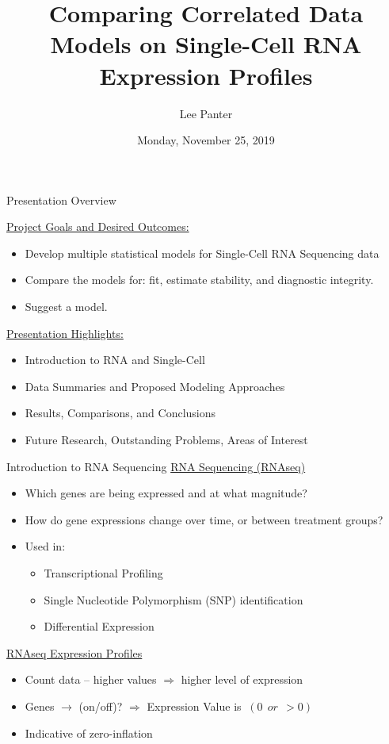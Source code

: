 \documentclass[11pt]{beamer}
\author{Lee Panter}
\title{Comparing Correlated Data Models on Single-Cell RNA Expression Profiles}
\date{Monday, November 25, 2019}
\begin{document}
\begin{frame}
\titlepage
\end{frame}


\begin{frame}{Presentation Overview}

\underline{Project Goals and Desired Outcomes:}
\begin{itemize}
	\item Develop multiple statistical models for Single-Cell RNA Sequencing data
	\item Compare the models for: fit, estimate stability, and diagnostic integrity.
	\item Suggest a model.  
\end{itemize}

\vspace{5pt}

\underline{Presentation Highlights:}
\begin{itemize}
	\item Introduction to RNA and Single-Cell
	\item Data Summaries and Proposed Modeling Approaches
	\item Results, Comparisons, and Conclusions
	\item Future Research, Outstanding Problems, Areas of Interest
\end{itemize}
\end{frame}

\begin{frame}{Introduction to RNA Sequencing}
	\underline{RNA Sequencing (RNAseq)}		
		\begin{itemize}
			\item Which genes are being expressed and at what magnitude?
			\item How do gene expressions change over time, or between treatment groups? \cite{maher2009transcriptome}	
			\item Used in: 
			\begin{itemize}
				\item Transcriptional Profiling
				\item Single Nucleotide Polymorphism (SNP) identification
				\item Differential Expression
			\end{itemize}
		\end{itemize}
	\underline{RNAseq Expression Profiles}
	\begin{itemize}
		\item Count data -- higher values $\Rightarrow$ higher level of expression
		\item Genes $\rightarrow$ (on/off)? $\Rightarrow$ Expression Value is $\ \left(  0 \ \ or \ \ > 0  \right)   \ $
		\item Indicative of zero-inflation
	\end{itemize}
\end{frame}
\end{document}
